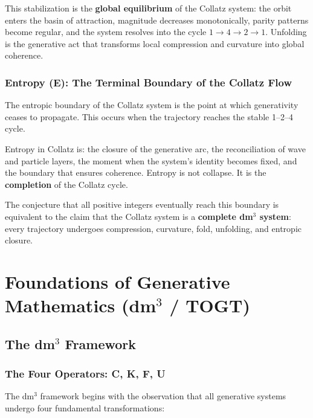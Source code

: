 \documentclass[14pt, twoside, openright]{book}
\theoremstyle{definition}
\theoremstyle{remark}
\begin{document}
This stabilization is the \textbf{global equilibrium} of the Collatz system:
the orbit enters the basin of attraction, magnitude decreases monotonically,
parity patterns become regular, and the system resolves into the cycle
$1 \to 4 \to 2 \to 1$. Unfolding is the generative act that transforms local
compression and curvature into global coherence.

\section{Entropy (E): The Terminal Boundary of the Collatz Flow}

The entropic boundary of the Collatz system is the point at which generativity
ceases to propagate. This occurs when the trajectory reaches the stable 1--2--4
cycle.

Entropy in Collatz is: the closure of the generative arc, the reconciliation of
wave and particle layers, the moment when the system's identity becomes fixed,
and the boundary that ensures coherence. Entropy is not collapse. It is the
\textbf{completion} of the Collatz cycle.

The conjecture that all positive integers eventually reach this boundary is
equivalent to the claim that the Collatz system is a \textbf{complete dm$^{3}$
system}: every trajectory undergoes compression, curvature, fold, unfolding, and
entropic closure.

\part{Foundations of Generative Mathematics (dm$^{3}$ / TOGT)}

\chapter{The \texorpdfstring{dm$^{3}$}{dm3} Framework}

\section{The Four Operators: C, K, F, U}

The dm$^{3}$ framework begins with the observation that all generative systems
undergo four fundamental transformations:
\end{document}

